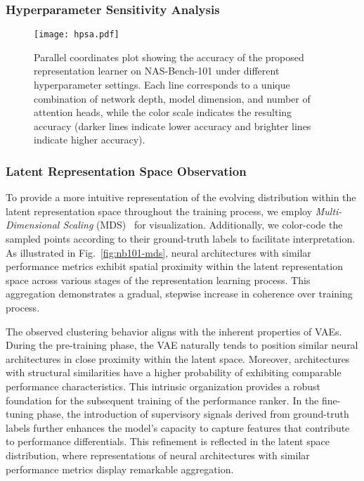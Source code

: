 \documentclass[../main.tex]{subfiles}
\begin{document}
\subsubsection{Hyperparameter Sensitivity Analysis}\label{sec:hyperparam-analysis}

\begin{figure}
  \centering
  \texttt{[image: hpsa.pdf]}
  \DiffBegin
  \caption{
    Parallel coordinates plot showing the accuracy of the proposed representation learner on NAS-Bench-101 under different hyperparameter settings.
    Each line corresponds to a unique combination of network depth, model dimension, and number of attention heads, while the color scale indicates the resulting accuracy (darker lines indicate lower accuracy and brighter lines indicate higher accuracy).
  }\label{fig:hyperparam-sensitivity}
  \DiffEnd
\end{figure}

\subsubsection{Latent Representation Space Observation}\label{sec:repre-space-analysis}

To provide a more intuitive representation of the evolving distribution within the latent representation space throughout the training process, we employ \textit{Multi-Dimensional Scaling} (MDS)~\cite{DOUGLASCARROLL1998179} for visualization.
Additionally, we color-code the sampled points according to their ground-truth labels to facilitate interpretation.
As illustrated in Fig.~\ref{fig:nb101-mds}, neural architectures with similar performance metrics exhibit spatial proximity within the latent representation space across various stages of the representation learning process.
This aggregation demonstrates a gradual, stepwise increase in coherence over training process.

The observed clustering behavior aligns with the inherent properties of VAEs. During the pre-training phase, the VAE naturally tends to position similar neural architectures in close proximity within the latent space. Moreover, architectures with structural similarities have a higher probability of exhibiting comparable performance characteristics. This intrinsic organization provides a robust foundation for the subsequent training of the performance ranker.
In the fine-tuning phase, the introduction of supervisory signals derived from ground-truth labels further enhances the model's capacity to capture features that contribute to performance differentials. This refinement is reflected in the latent space distribution, where representations of neural architectures with similar performance metrics display remarkable aggregation.
\end{document}
